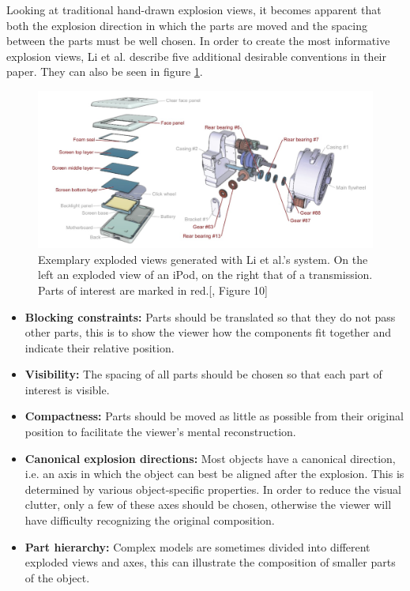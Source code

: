 Looking at traditional hand-drawn explosion views, it becomes apparent that both the explosion direction in which the parts are moved and the spacing between the parts must be well chosen. 
In order to create the most informative explosion views, Li et al.\cite{Wilmot_Li_2008} describe five additional desirable conventions in their paper.
They can also be seen in figure \ref{fig:exampleExpl_Li2008}.
\begin{figure}[h]

	\centering
	\includegraphics[width=.9\linewidth]{fig/Images/Li_2008}
	\caption[]{Exemplary exploded views generated with Li et al.'s system. On the left an exploded view of an iPod, on the right that of a transmission. Parts of interest are marked in red.[\cite{Wilmot_Li_2008}, Figure 10]}
	\label{fig:exampleExpl_Li2008}
\end{figure}


\begin{itemize}
	\item \textbf{Blocking constraints:} Parts should be translated so that they do not pass other parts, this is to show the viewer how the components fit together and indicate their relative position.
	\item \textbf{Visibility:} The spacing of all parts should be chosen so that each part of interest is visible.
	\item \textbf{Compactness:} Parts should be moved as little as possible from their original position to facilitate the viewer's mental reconstruction.
	\item \textbf{Canonical explosion directions:} Most objects have a canonical direction, i.e. an axis in which the object can best be aligned after the explosion. This is determined by various object-specific properties. In order to reduce the visual clutter, only a few of these axes should be chosen, otherwise the viewer will have difficulty recognizing the original composition.
	\item \textbf{Part hierarchy:} Complex models are sometimes divided into different exploded views and axes, this can illustrate the composition of smaller parts of the object.
	\label{items:best_practise}
\end{itemize}

